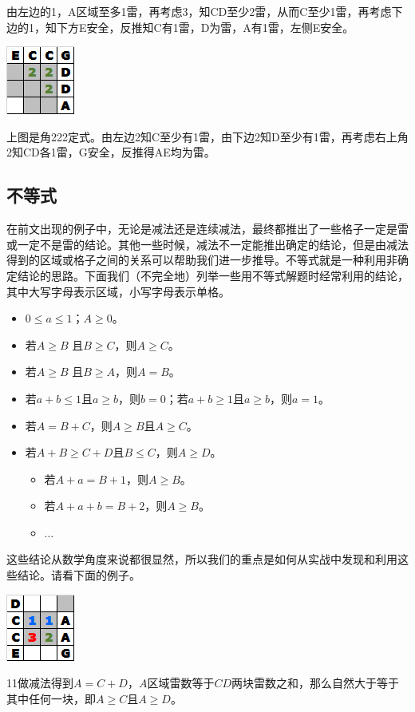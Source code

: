 由左边的1，A区域至多1雷，再考虑3，知CD至少2雷，从而C至少1雷，再考虑下边的1，知下方E安全，反推知C有1雷，D为雷，A有1雷，左侧E安全。

\vspace{5mm}
\begin{center}
    \includegraphics{trick/减法6.png}
\end{center}
上图是角222定式。由左边2知C至少有1雷，由下边2知D至少有1雷，再考虑右上角2知CD各1雷，G安全，反推得AE均为雷。

\subsection{不等式}
在前文出现的例子中，无论是减法还是连续减法，最终都推出了一些格子一定是雷或一定不是雷的结论。其他一些时候，减法不一定能推出确定的结论，但是由减法得到的区域或格子之间的关系可以帮助我们进一步推导。不等式就是一种利用非确定结论的思路。下面我们（不完全地）列举一些用不等式解题时经常利用的结论，其中大写字母表示区域，小写字母表示单格。

\begin{itemize}
    \item $0\le a\le 1$；$A\ge 0$。
    \item 若$A\ge B$ 且$B\ge C$，则$A\ge C$。
    \item 若$A\ge B$ 且$B\ge A$，则$A=B$。
    \item 若$a+b\le 1$且$a\ge b$，则$b=0$；若$a+b\ge 1$且$a\ge b$，则$a=1$。
    \item 若$A=B+C$，则$A\ge B$且$A\ge C$。
    \item 若$A+B\ge C+D$且$B\le C$，则$A\ge D$。
    \begin{itemize}
        \item 若$A+a=B+1$，则$A\ge B$。
        \item 若$A+a+b=B+2$，则$A\ge B$。
        \item $\dots$
    \end{itemize}
\end{itemize}

这些结论从数学角度来说都很显然，所以我们的重点是如何从实战中发现和利用这些结论。请看下面的例子。

\vspace{5mm}
\begin{center}
    \includegraphics{trick/不等式1.png}
\end{center}
11做减法得到$A=C+D$，$A$区域雷数等于$CD$两块雷数之和，那么自然大于等于其中任何一块，即$A\ge C$且$A\ge D$。


